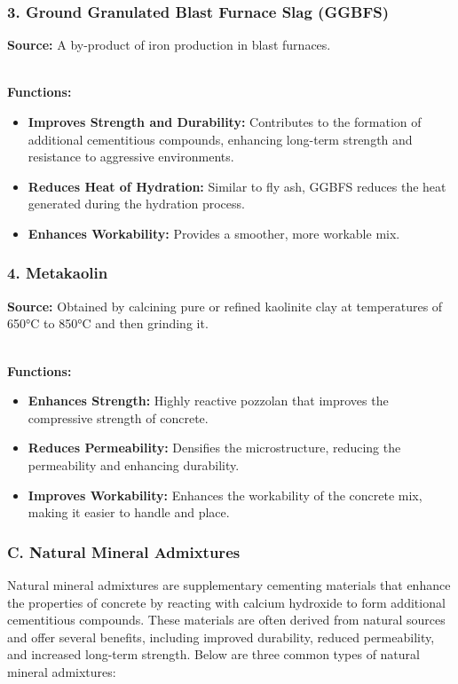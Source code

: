 \documentclass[a4paper,11pt]{book}
\begin{document}
\subsubsection*{3. Ground Granulated Blast Furnace Slag (GGBFS)}
\textbf{Source:} A by-product of iron production in blast furnaces.

\textbf{\\Functions:}
\begin{itemize}
    \item \textbf{Improves Strength and Durability:} Contributes to the formation of additional cementitious compounds, enhancing long-term strength and resistance to aggressive environments.
    \item \textbf{Reduces Heat of Hydration:} Similar to fly ash, GGBFS reduces the heat generated during the hydration process.
    \item \textbf{Enhances Workability:} Provides a smoother, more workable mix.
\end{itemize}

\subsubsection*{4. Metakaolin}
\textbf{Source:} Obtained by calcining pure or refined kaolinite clay at temperatures of 650°C to 850°C and then grinding it.

\textbf{\\Functions:}
\begin{itemize}
    \item \textbf{Enhances Strength:} Highly reactive pozzolan that improves the compressive strength of concrete.
    \item \textbf{Reduces Permeability:} Densifies the microstructure, reducing the permeability and enhancing durability.
    \item \textbf{Improves Workability:} Enhances the workability of the concrete mix, making it easier to handle and place.
\end{itemize}
\subsubsection*{C. Natural Mineral Admixtures}

Natural mineral admixtures are supplementary cementing materials that enhance the properties of concrete by reacting with calcium hydroxide to form additional cementitious compounds. These materials are often derived from natural sources and offer several benefits, including improved durability, reduced permeability, and increased long-term strength. Below are three common types of natural mineral admixtures:
\end{document}

